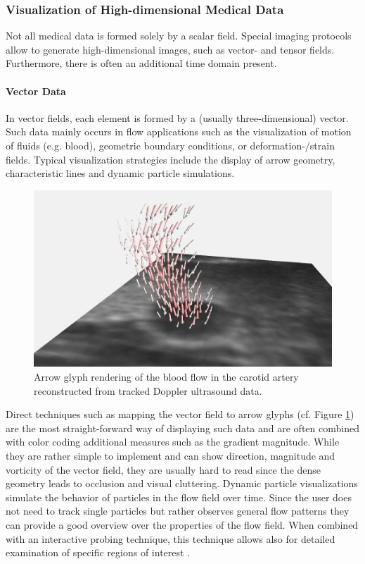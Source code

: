 \subsubsection{Visualization of High-dimensional Medical Data}
Not all medical data is formed solely by a scalar field.
Special imaging protocols allow to generate high-dimensional images, such as vector- and tensor fields.
Furthermore, there is often an additional time domain present.

\paragraph{Vector Data}
In vector fields, each element is formed by a (usually three-dimensional) vector.
Such data mainly occurs in flow applications such as the visualization of motion of fluids (e.g. blood), geometric boundary conditions, or deformation-/strain fields.
Typical visualization strategies include the display of arrow geometry, characteristic lines and dynamic particle simulations.

\begin{figure}[ht]
	\centering
	\includegraphics[width=0.75\linewidth]{figures/background/arrow-rendering.jpg}
	\caption{
		Arrow glyph rendering of the blood flow in the carotid artery reconstructed from tracked Doppler ultrasound data.
	}
	\label{fig:background:arrow-rendering}
\end{figure}
Direct techniques such as mapping the vector field to arrow glyphs (cf. Figure \ref{fig:background:arrow-rendering}) are the most straight-forward way of displaying such data and are often combined with color coding additional measures such as the gradient magnitude.
While they are rather simple to implement and can show direction, magnitude and vorticity of the vector field, they are usually hard to read since the dense geometry leads to occlusion and visual cluttering.
Dynamic particle visualizations simulate the behavior of particles in the flow field over time.
Since the user does not need to track single particles but rather observes general flow patterns they can provide a good overview over the properties of the flow field.
When combined with an interactive probing technique, this technique allows also for detailed examination of specific regions of interest \cite{VanPelt:2011:InteractiveProbing}.

